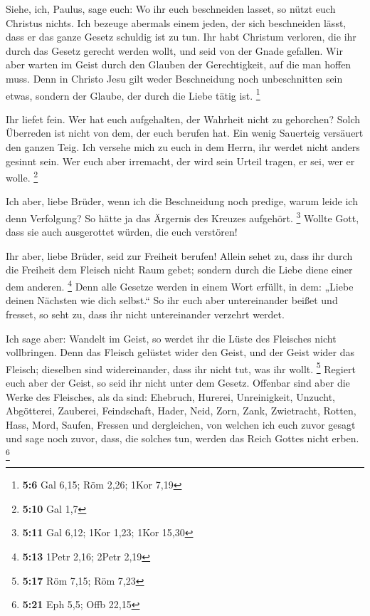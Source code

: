  Siehe, ich, Paulus, sage euch: Wo ihr euch beschneiden
lasset, so nützt euch Christus nichts.  Ich bezeuge abermals
einem jeden, der sich beschneiden lässt, dass er das ganze Gesetz
schuldig ist zu tun.  Ihr habt Christum verloren, die ihr
durch das Gesetz gerecht werden wollt, und seid von der Gnade gefallen.
 Wir aber warten im Geist durch den Glauben der
Gerechtigkeit, auf die man hoffen muss.  Denn in Christo
Jesu gilt weder Beschneidung noch unbeschnitten sein etwas, sondern der
Glaube, der durch die Liebe tätig ist. \footnote{\textbf{5:6} Gal 6,15;
  Röm 2,26; 1Kor 7,19}

 Ihr liefet fein. Wer hat euch aufgehalten, der Wahrheit
nicht zu gehorchen?  Solch Überreden ist nicht von dem, der
euch berufen hat.  Ein wenig Sauerteig versäuert den ganzen
Teig.  Ich versehe mich zu euch in dem Herrn, ihr werdet
nicht anders gesinnt sein. Wer euch aber irremacht, der wird sein Urteil
tragen, er sei, wer er wolle. \footnote{\textbf{5:10} Gal 1,7}

 Ich aber, liebe Brüder, wenn ich die Beschneidung noch
predige, warum leide ich denn Verfolgung? So hätte ja das Ärgernis des
Kreuzes aufgehört. \footnote{\textbf{5:11} Gal 6,12; 1Kor 1,23; 1Kor
  15,30}  Wollte Gott, dass sie auch ausgerottet würden,
die euch verstören!

 Ihr aber, liebe Brüder, seid zur Freiheit berufen! Allein
sehet zu, dass ihr durch die Freiheit dem Fleisch nicht Raum gebet;
sondern durch die Liebe diene einer dem anderen. \footnote{\textbf{5:13}
  1Petr 2,16; 2Petr 2,19}  Denn alle Gesetze werden in
einem Wort erfüllt, in dem: „Liebe deinen Nächsten wie dich selbst.``
 So ihr euch aber untereinander beißet und fresset, so seht
zu, dass ihr nicht untereinander verzehrt werdet.

 Ich sage aber: Wandelt im Geist, so werdet ihr die Lüste
des Fleisches nicht vollbringen.  Denn das Fleisch gelüstet
wider den Geist, und der Geist wider das Fleisch; dieselben sind
widereinander, dass ihr nicht tut, was ihr wollt. \footnote{\textbf{5:17}
  Röm 7,15; Röm 7,23}  Regiert euch aber der Geist, so seid
ihr nicht unter dem Gesetz.  Offenbar sind aber die Werke
des Fleisches, als da sind: Ehebruch, Hurerei, Unreinigkeit, Unzucht,
 Abgötterei, Zauberei, Feindschaft, Hader, Neid, Zorn,
Zank, Zwietracht, Rotten, Hass, Mord,  Saufen, Fressen und
dergleichen, von welchen ich euch zuvor gesagt und sage noch zuvor,
dass, die solches tun, werden das Reich Gottes nicht erben. \footnote{\textbf{5:21}
  Eph 5,5; Offb 22,15}

